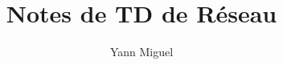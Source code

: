 \documentclass[12pt, a4paper]{article}
\title{Notes de TD de Réseau}
\author{Yann Miguel}
\begin{document}
\ttfamily
\maketitle
\tableofcontents
\newpage




\end{document}
